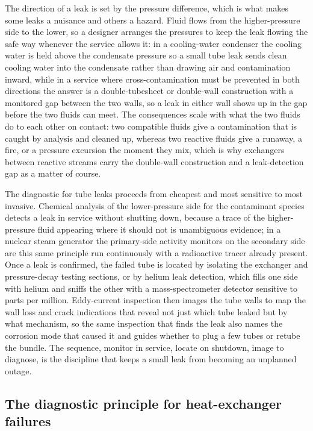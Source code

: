 The direction of a leak is set by the pressure difference, which is what makes some
leaks a nuisance and others a hazard. Fluid flows from the higher-pressure side to
the lower, so a designer arranges the pressures to keep the leak flowing the safe
way whenever the service allows it: in a cooling-water condenser the cooling water
is held above the condensate pressure so a small tube leak sends clean cooling water
into the condensate rather than drawing air and contamination inward, while in a
service where cross-contamination must be prevented in both directions the answer is
a double-tubesheet or double-wall construction with a monitored gap between the two
walls, so a leak in either wall shows up in the gap before the two fluids can meet.
The consequences scale with what the two fluids do to each other on contact: two
compatible fluids give a contamination that is caught by analysis and cleaned up,
whereas two reactive fluids give a runaway, a fire, or a pressure excursion the
moment they mix, which is why exchangers between reactive streams carry the
double-wall construction and a leak-detection gap as a matter of course.

The diagnostic for tube leaks proceeds from cheapest and most sensitive to most
invasive. Chemical analysis of the lower-pressure side for the contaminant species
detects a leak in service without shutting down, because a trace of the
higher-pressure fluid appearing where it should not is unambiguous evidence; in a
nuclear steam generator the primary-side activity monitors on the secondary side are
this same principle run continuously with a radioactive tracer already present.
Once a leak is confirmed, the failed tube is located by isolating the exchanger and
pressure-decay testing sections, or by helium leak detection, which fills one side
with helium and sniffs the other with a mass-spectrometer detector sensitive to
parts per million. Eddy-current inspection then images the tube walls to map the
wall loss and crack indications that reveal not just which tube leaked but by what
mechanism, so the same inspection that finds the leak also names the corrosion mode
that caused it and guides whether to plug a few tubes or retube the bundle. The
sequence, monitor in service, locate on shutdown, image to diagnose, is the
discipline that keeps a small leak from becoming an unplanned outage.

\subsection{The diagnostic principle for heat-exchanger failures}

